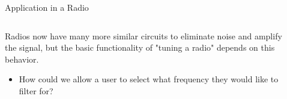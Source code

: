 \documentclass{beamer}
\begin{document}
\begin{frame}{Application in a Radio}
	\begin{columns}
	\begin{column}{.6\textwidth}
    Radios now have many more similar circuits to eliminate noise and amplify the signal, but the basic functionality of "tuning a radio" depends on this behavior.
    \begin{itemize} \item How could we allow a user to select what frequency they would like to filter for?  \end{itemize}
	\end{column}	
	\begin{column}{.4\textwidth}
\end{column}
\end{columns}
\end{frame}
\end{document}

